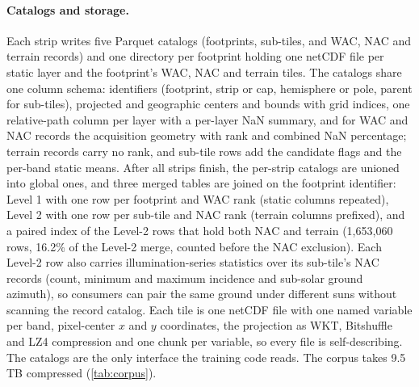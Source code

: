 \paragraph{Catalogs and storage.} Each strip writes five Parquet catalogs (footprints, sub-tiles, and WAC, NAC and terrain records) and one directory per footprint holding one netCDF file per static layer and the footprint's WAC, NAC and terrain tiles. The catalogs share one column schema: identifiers (footprint, strip or cap, hemisphere or pole, parent for sub-tiles), projected and geographic centers and bounds with grid indices, one relative-path column per layer with a per-layer NaN summary, and for WAC and NAC records the acquisition geometry with rank and combined NaN percentage; terrain records carry no rank, and sub-tile rows add the candidate flags and the per-band static means. After all strips finish, the per-strip catalogs are unioned into global ones, and three merged tables are joined on the footprint identifier: Level 1 with one row per footprint and WAC rank (static columns repeated), Level 2 with one row per sub-tile and NAC rank (terrain columns prefixed), and a paired index of the Level-2 rows that hold both NAC and terrain (1,653,060 rows, 16.2\% of the Level-2 merge, counted before the NAC exclusion). Each Level-2 row also carries illumination-series statistics over its sub-tile's NAC records (count, minimum and maximum incidence and sub-solar ground azimuth), so consumers can pair the same ground under different suns without scanning the record catalog. Each tile is one netCDF file with one named variable per band, pixel-center $x$ and $y$ coordinates, the projection as WKT, Bitshuffle and LZ4 compression and one chunk per variable, so every file is self-describing. The catalogs are the only interface the training code reads. The corpus takes 9.5\,TB compressed (\cref{tab:corpus}).


